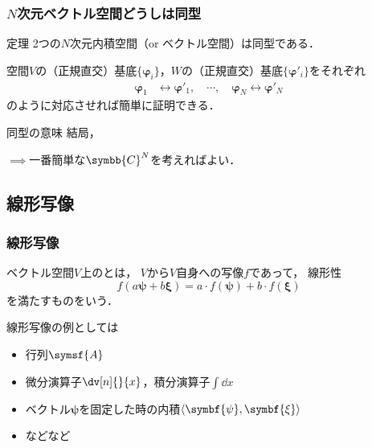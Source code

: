 \documentclass[
    10pt,
    ]{sotsu-beamer}
\begin{document}
\begin{frame}
    \frametitle{$N$次元ベクトル空間どうしは同型}

    \begin{block}{定理}
        2つの$N$次元内積空間（or ベクトル空間）は同型である．
    \end{block}

    空間$V$の（正規直交）基底$\{\symbf{\varphi}_i\}$，$W$の（正規直交）基底$\{\symbf{\varphi}'_i\}$をそれぞれ
    \begin{align*}
        \symbf{\varphi}_1 &\leftrightarrow \symbf{\varphi}'_1, 
        \quad
        \cdots, 
        \quad
        \symbf{\varphi}_N \leftrightarrow \symbf{\varphi}'_N
    \end{align*}
    のように対応させれば簡単に証明できる．

    \pause

    \begin{alertblock}{同型の意味}
        結局，
    \end{alertblock}

    $\implies$一番簡単な$\symbb{C}^N$を考えればよい．

\end{frame}



\subsection{線形写像}

\begin{frame}
    \frametitle{線形写像}

    ベクトル空間$V$上のとは，
    $V$から$V$自身への写像$f$であって，
    線形性
    \begin{equation*}
        f(a \symbf{\psi} + b \symbf{\xi}) = a \cdotp f(\symbf{\psi}) + b \cdotp f(\symbf{\xi})
    \end{equation*}
    を満たすものをいう．

    \pause

    線形写像の例としては
    \begin{itemize}
        \item 行列$\symsf{A}$
        \item 微分演算子$\dv[n]{}{x}$，積分演算子$\int \dd{x}$
        \item ベクトル$\symbf{\psi}$を固定した時の内積$\iparen{\symbf{\psi}, \symbf{\xi}}$
        \item などなど
    \end{itemize}

\end{frame}
\end{document}
